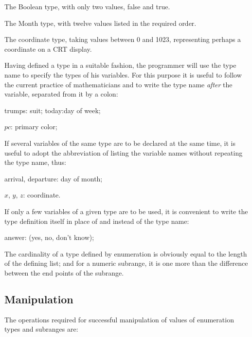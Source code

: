 \documentclass[twoside,11pt]{book}
\begin{document}
\quad The Boolean type, with only two values, false and true.

\quad The Month type, with twelve values listed in the required order.

\parindent\quad The coordinate type, taking values between 0 and 1023, representing perhaps a coordinate on a CRT display.

Having defined a type in a suitable fashion, the programmer will use the type name to specify the types of his variables. For this purpose it is useful to follow the current practice of mathematicians and to write the type name \textit{after} the variable, separated from it by a colon:

\quad trumps: suit; today:day of week;

\quad $pc$: primary color;

\noindent
If several variables of the same type are to be declared at the same time, it is useful to adopt the abbreviation of listing the variable names without repeating the type name, thus:

\quad arrival, departure: day of month;

\quad $x$, $y$, $z$: coordinate.

\noindent
If only a few variables of a given type are to be used, it is convenient to write the type definition itself in place of and instead of the type name:

\quad answer: (yes, no, don't know);

The cardinality of a type defined by enumeration is obviously equal to the length of the defining list; and for a numeric subrange, it is one more than the difference between the end points of the subrange.

\subsection{Manipulation}

The operations required for successful manipulation of values of enumeration types and subranges are:
\end{document}
